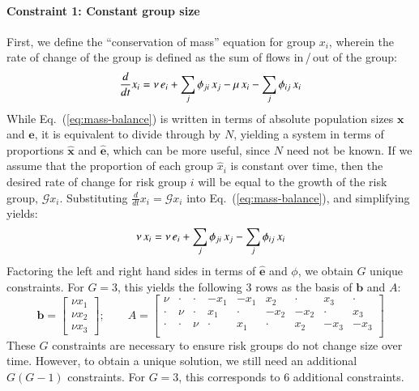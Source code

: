 \paragraph{Constraint 1: Constant group size}
First, we define the ``conservation of mass'' equation for group $x_i$,
wherein the rate of change of the group
is defined as the sum of flows in\,/\,out of the group:
\begin{equation}\label{eq:mass-balance}
\frac{d}{dt}x_i
= \nu \thinspace e_i + \sum_{j}{\phi_{ji} \thinspace x_j}
- \mu \thinspace x_i - \sum_{j}{\phi_{ij} \thinspace x_i}
\end{equation}
While Eq.~(\ref{eq:mass-balance}) is written in terms of
absolute population sizes $\bm{x}$ and $\bm{e}$,
it is equivalent to divide through by $N$,
yielding a system in terms of
proportions $\bm{\hat{x}}$ and $\bm{\hat{e}}$,
which can be more useful, since $N$ need not be known.
If we assume that the proportion of each group $\hat{x}_i$ is constant over time,
then the desired rate of change for risk group $i$
will be equal to the growth of the risk group, $\mathcal{G} x_i$.
Substituting $\frac{d}{dt}x_i = \mathcal{G} x_i$
into Eq.~(\ref{eq:mass-balance}),
and simplifying yields:
\begin{equation}\label{eq:system}
\nu \thinspace x_i
= \nu \thinspace e_i + \sum_{j}{\phi_{ji} \thinspace x_j}
- \sum_{j}{\phi_{ij} \thinspace x_i}
\end{equation}
Factoring the left and right hand sides in terms of $\bm{\hat{e}}$ and $\phi$,
we obtain $G$ unique constraints.
For $G = 3$, this yields the following 3 rows as the basis of $\bm{b}$ and $A$:
\begin{equation}\label{eq:b-A-basis}
\bm{b} = \left[\begin{array}{c}
\nu x_1 \\ \nu x_2 \\ \nu x_3
\end{array}\right];\qquad
A = \left[\begin{array}{ccccccccc}
 \nu  & \cdot & \cdot & -x_1  & -x_1  &  x_2  & \cdot &  x_3  & \cdot \\
\cdot &  \nu  & \cdot &  x_1  & \cdot & -x_2  & -x_2  & \cdot &  x_3  \\
\cdot & \cdot &  \nu  & \cdot &  x_1  & \cdot &  x_2  & -x_3  & -x_3  \\
\end{array}\right] 
\end{equation}
These $G$ constraints are necessary to ensure risk groups do not change size over time.
However, to obtain a unique solution,
we still need an additional $G(G-1)$ constraints.
For $G = 3$, this corresponds to 6 additional constraints.
